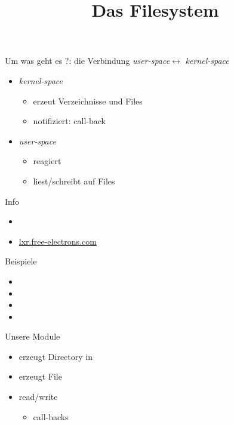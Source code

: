 \documentclass{beamer}
\begin{document}
\newcommand{\ksp}{{\em kernel-space}\xspace}
\newcommand{\usp}{{\em user-space}\xspace}

\title[sysfs]{Das Filesystem \\}

\frame{\titlepage}

\begin{frame}{Um was geht es ?}{: die Verbindung \usp $\leftrightarrow$ \ksp}
 \begin{itemize}
  \item \ksp
  \begin{itemize}
    \item erzeut Verzeichnisse und Files
    \item notifiziert: call-back
  \end{itemize} 
  \item \usp
  \begin{itemize}
   \item reagiert 
   \item liest/schreibt auf Files
  \end{itemize} 
 \end{itemize} 
 \begin{block}{Info}
 \begin{itemize}
  \item {}
  \item \url{lxr.free-electrons.com}
 \end{itemize}
 \end{block}
\end{frame}


\begin{frame}{Beispiele}
 \begin{itemize}
  \item {}
  \item {}
  \item {}
  \item {}
 \end{itemize}
\end{frame}

\begin{frame}{Unsere Module}
 \begin{itemize}
  \item {} erzeugt Directory in 
  \item {} erzeugt File
  \item {} read/write
  \begin{itemize}
   \item call-backs
  \end{itemize}
 \end{itemize}
\end{frame}
\end{document}
